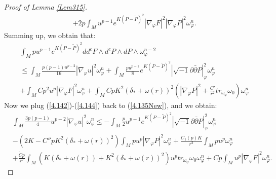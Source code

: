 \documentclass[11pt]{amsart}
\numberwithin{equation}{section}
\begin{document}
\begin{proof}[Proof of Lemma \ref{Lem315}]
\begin{equation*}
\begin{split}
&+2p\int_Mu^{p-1}e^{K(P-\tilde{P})^2}|\nabla_{\varphi}F|^2|\nabla_{\varphi}P|^2\omega_{\varphi}^n.
\end{split}
\end{equation*}
Summing up,  we obtain that:
\begin{equation}\label{4.144}
\begin{split}
&\int_Mpu^{p-1}e^{K(P-\tilde{P})^2}dd^cF\wedge d^cP\wedge dP\wedge \omega_{\varphi}^{n-2}\\
&\le \int_M\frac{p(p-1)u^{p-2}}{16}|\nabla_{\varphi}u|^2\omega_{\varphi}^n+\int_M\frac{pu^{p-1}}{8}e^{K(P-\tilde{P})^2}|\sqrt{-1}\partial\bar{\partial}P|^2_{\varphi}\omega_{\varphi}^n\\
&+\int_MCp^2u^p|\nabla_{\varphi}F|^2\omega_{\varphi}^n+\int_MCpK^2(\delta_*+\omega(r))^2(|\nabla_{\varphi}P|^2+\frac{C'}{r^2}tr_{\omega_{\varphi}}\omega_0)\omega_{\varphi}^n
\end{split}
\end{equation}
Now we plug (\ref{4.142})-(\ref{4.144}) back to (\ref{4.135New}),  and we obtain:
\begin{equation}
\begin{split}
&\int_M\frac{3p(p-1)}{4}u^{p-2}|\nabla_{\varphi}u|^2\omega_{\varphi}^n\le -\int_M\frac{p}{2}u^{p-1}e^{K(P-\tilde{P})^2}|\sqrt{-1}\partial\bar{\partial}P|^2_{\varphi}\omega_{\varphi}^n\\
&-(2K-C''pK^2(\delta_*+\omega(r))^2)\int_Mpu^p|\nabla_{\varphi}P|^2\omega_{\varphi}^n+\frac{C_1(p)K}{r^2}\int_Mpu^p\omega_{\varphi}^n\\
&+\frac{\tilde{C}p}{r^2}\int_M(K(\delta_*+\omega(r))+K^2(\delta_*+\omega(r))^2)u^ptr_{\omega_{\varphi}}\omega_0\omega_{\varphi}^n+Cp\int_Mu^p|\nabla_{\varphi}F|^2\omega_{\varphi}^n.
\end{split}
\end{equation}


\end{proof}
\end{document}
